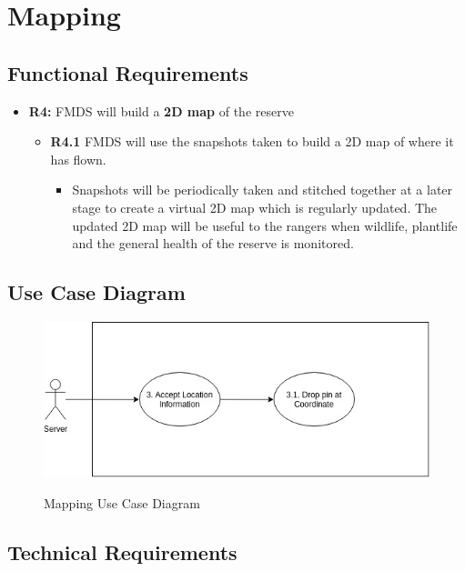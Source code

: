 \section{Mapping}

\subsection{Functional Requirements}

	\begin{flushleft}
		\begin{itemize}
			\item{\textbf{R4:}} FMDS will build a \textbf{2D map} of the reserve

				\begin{itemize}
					\item{\textbf{R4.1}} FMDS will use the snapshots taken to build a 2D map of where it has flown.
						\begin{itemize}
							\item Snapshots will be periodically taken and stitched together at a later stage to create a virtual 2D map which is regularly updated. The updated 2D map will be useful to the rangers when wildlife, plantlife and the general health of the reserve is monitored.
						\end{itemize} 
				\end{itemize}
		\end{itemize}
	\end{flushleft}

\subsection{Use Case Diagram}
	\begin{center}
		\begin{flushleft}
			\begin{figure}[h!]
				\centering
				\includegraphics[scale=0.45]{./assets/images/mapping-ucd.jpg}
				\label{fig: object-recognition-ucd }
				\caption{Mapping Use Case Diagram}
			\end{figure}
		\end{flushleft}
	\end{center}

\subsection{Technical Requirements}
	\begin{flushleft}
	\end{flushleft}
